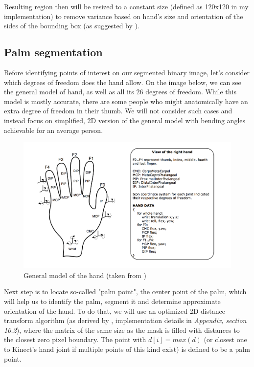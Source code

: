 \documentclass[a4paper,11pt,oneside]{article}
\begin{document}
Resulting region then will be resized to a constant size (defined as 120x120 in my implementation) to remove variance based on hand's size and orientation of the sides of the bounding box (as suggested by \cite{HI01}).

\subsection{Palm segmentation}

Before identifying points of interest on our segmented binary image, let's consider which degrees of freedom does the hand allow. On the image below, we can see the general model of hand, as well as all its 26 degrees of freedom. While this model is mostly accurate, there are some people who might anatomically have an extra degree of freedom in their thumb. We will not consider such cases and instead focus on simplified, 2D version of the general model with bending angles achievable for an average person.

\begin{figure}[H]
\centering
\includegraphics[scale=0.47]{hand-dof.png}
\caption{General model of the hand (taken from \cite{OT01})}
\end{figure}

Next step is to locate so-called "palm point", the center point of the palm, which will help us to identify the palm, segment it and determine approximate orientation of the hand. To do that, we will use an optimized 2D distance transform algorithm (as derived by \cite{DT01}, implementation details in \textit{Appendix, section 10.2}), where the matrix of the same size as the mask is filled with distances to the closest zero pixel boundary. The point with $d[i] = max(d)$ (or closest one to Kinect's hand joint if multiple points of this kind exist) is defined to be a palm point.
\end{document}
